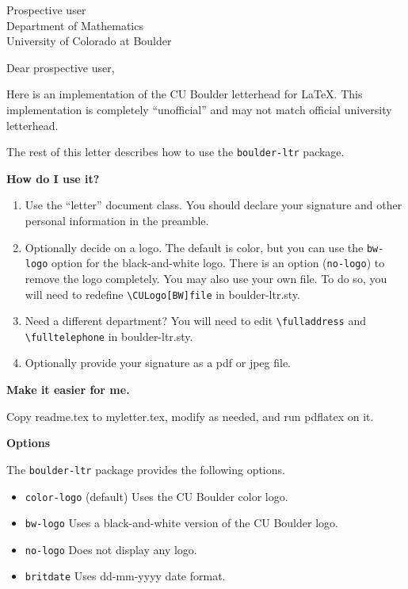 \documentclass{letter}
\begin{document}
\begin{letter}
{Prospective user\\
Department of Mathematics\\
University of Colorado at Boulder
}

\date{\today}

\opening{Dear prospective user,}

Here is an implementation of the CU Boulder letterhead for \LaTeX.  This implementation is completely ``unofficial'' and may not match official university letterhead.  

The rest of this letter describes how to use the {\verb+boulder-ltr+} package.  

{\bf How do I use it?}
\begin{enumerate}

\item Use the ``letter'' document class.  You should declare your signature and other personal information in the preamble.  

\item Optionally decide on a logo.  The default is color, but you can use the {\verb+bw-logo+} option for the black-and-white logo.  There is an option ({\verb+no-logo+}) to remove the logo completely.  You may also use your own file.  To do so, you will need to redefine {\verb+\CULogo[BW]file+} in boulder-ltr.sty.

\item Need a different department? You will need to edit {\verb+\fulladdress+} and {\verb+\fulltelephone+} in boulder-ltr.sty.  

\item Optionally provide your signature as a pdf or jpeg file.

\end{enumerate}

{\bf Make it easier for me.}

Copy readme.tex to myletter.tex, modify as needed, and run pdflatex on it.

{\bf Options}

The {\verb+boulder-ltr+} package provides the following options.
\begin{itemize}
	\item {\verb+color-logo+} (default) Uses the CU Boulder color logo.
	\item {\verb+bw-logo+} Uses a black-and-white version of the CU Boulder logo.
	\item {\verb+no-logo+} Does not display any logo.
	\item {\verb+britdate+} Uses dd-mm-yyyy date format.
\end{itemize} 


\end{letter}
\end{document}
